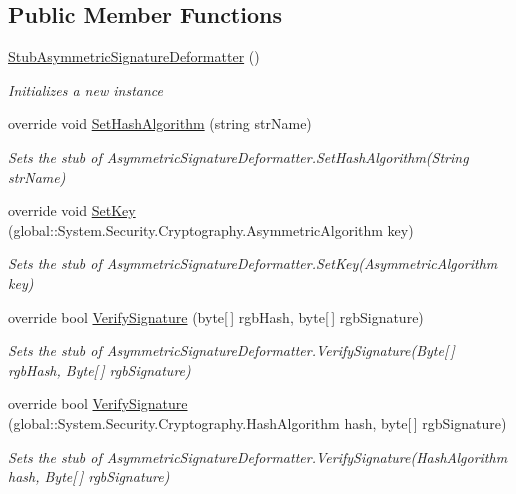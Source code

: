\subsection*{Public Member Functions}
\begin{DoxyCompactItemize}
\item 
\hyperlink{class_system_1_1_security_1_1_cryptography_1_1_fakes_1_1_stub_asymmetric_signature_deformatter_a1055ac5c24d2372c8d87d5d9bd66e9f7}{Stub\-Asymmetric\-Signature\-Deformatter} ()
\begin{DoxyCompactList}\small\item\em Initializes a new instance\end{DoxyCompactList}\item 
override void \hyperlink{class_system_1_1_security_1_1_cryptography_1_1_fakes_1_1_stub_asymmetric_signature_deformatter_a2e902731443a4a20149edb16a4773bdd}{Set\-Hash\-Algorithm} (string str\-Name)
\begin{DoxyCompactList}\small\item\em Sets the stub of Asymmetric\-Signature\-Deformatter.\-Set\-Hash\-Algorithm(\-String str\-Name)\end{DoxyCompactList}\item 
override void \hyperlink{class_system_1_1_security_1_1_cryptography_1_1_fakes_1_1_stub_asymmetric_signature_deformatter_afb4b31c879306bf6457b811b9e05274d}{Set\-Key} (global\-::\-System.\-Security.\-Cryptography.\-Asymmetric\-Algorithm key)
\begin{DoxyCompactList}\small\item\em Sets the stub of Asymmetric\-Signature\-Deformatter.\-Set\-Key(\-Asymmetric\-Algorithm key)\end{DoxyCompactList}\item 
override bool \hyperlink{class_system_1_1_security_1_1_cryptography_1_1_fakes_1_1_stub_asymmetric_signature_deformatter_a10afa753e44951395375b976580dae03}{Verify\-Signature} (byte\mbox{[}$\,$\mbox{]} rgb\-Hash, byte\mbox{[}$\,$\mbox{]} rgb\-Signature)
\begin{DoxyCompactList}\small\item\em Sets the stub of Asymmetric\-Signature\-Deformatter.\-Verify\-Signature(\-Byte\mbox{[}$\,$\mbox{]} rgb\-Hash, Byte\mbox{[}$\,$\mbox{]} rgb\-Signature)\end{DoxyCompactList}\item 
override bool \hyperlink{class_system_1_1_security_1_1_cryptography_1_1_fakes_1_1_stub_asymmetric_signature_deformatter_ac6809c00d0d3f1da59c6dabcfa92e5c9}{Verify\-Signature} (global\-::\-System.\-Security.\-Cryptography.\-Hash\-Algorithm hash, byte\mbox{[}$\,$\mbox{]} rgb\-Signature)
\begin{DoxyCompactList}\small\item\em Sets the stub of Asymmetric\-Signature\-Deformatter.\-Verify\-Signature(\-Hash\-Algorithm hash, Byte\mbox{[}$\,$\mbox{]} rgb\-Signature)\end{DoxyCompactList}\end{DoxyCompactItemize}
